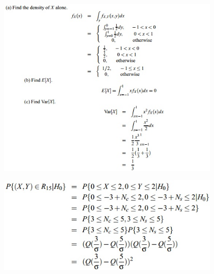\documentclass[11pt,landscape]{article}
\begin{document}
\begin{multicols}{3}
\setlength{\premulticols}{1pt}
\setlength{\postmulticols}{1pt}
\setlength{\multicolsep}{1pt}
\setlength{\columnsep}{2pt}

\begin{figure}[H]
    \includegraphics[scale=0.58]{./Images/2/joint1.jpg}
\end{figure}
\begin{figure}[H]
    \includegraphics[scale=0.58]{./Images/2/constellation.jpg}
\end{figure}
\begin{figure}[H]

\end{figure}
\end{multicols}
\end{document}
